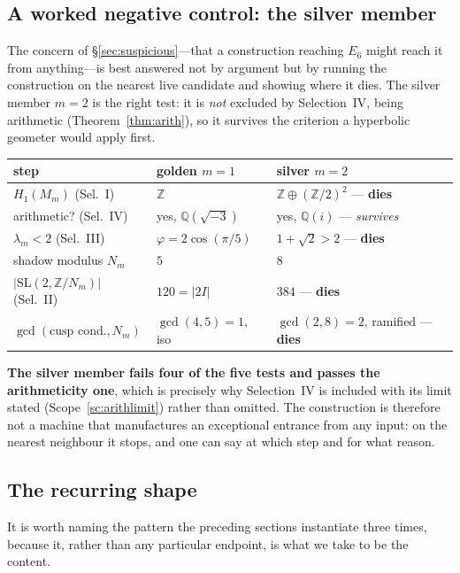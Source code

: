 \documentclass[11pt,reqno]{amsart}
\theoremstyle{plain}
\theoremstyle{definition}
\theoremstyle{remark}
\newcommand{\Q}{\mathbb{Q}}
\newcommand{\Z}{\mathbb{Z}}
\newcommand{\SL}{\mathrm{SL}}
\begin{document}
\subsection{A worked negative control: the silver member}\label{sec:silver}

The concern of \S\ref{sec:suspicious}---that a construction reaching $E_6$ might reach it
from anything---is best answered not by argument but by running the construction on the
nearest live candidate and showing where it dies. The silver member $m=2$ is the right
test: it is \emph{not} excluded by Selection~IV, being arithmetic
(Theorem~\ref{thm:arith}), so it survives the criterion a hyperbolic geometer would apply
first.

\begin{table}[h]
\centering\small
\begin{tabular}{@{}p{}p{}p{}@{}}
\toprule
step & golden $m=1$ & silver $m=2$\\
\midrule
$H_1(M_m)$ (Sel.~I) & $\Z$ & $\Z\oplus(\Z/2)^2$ --- \textbf{dies}\\
arithmetic? (Sel.~IV) & yes, $\Q(\sqrt{-3})$ & yes, $\Q(i)$ --- \emph{survives}\\
$\lambda_m<2$ (Sel.~III) & $\varphi=2\cos(\pi/5)$ & $1+\sqrt2>2$ --- \textbf{dies}\\
shadow modulus $N_m$ & $5$ & $8$\\
$|\SL(2,\Z/N_m)|$ (Sel.~II) & $120=|2I|$ & $384$ --- \textbf{dies}\\
$\gcd(\text{cusp cond.},N_m)$ & $\gcd(4,5)=1$, iso & $\gcd(2,8)=2$, ramified --- \textbf{dies}\\
\bottomrule
\end{tabular}
\end{table}

\textbf{The silver member fails four of the five tests and passes the arithmeticity
one}, which is precisely why Selection~IV is included with its limit stated
(Scope~\ref{sc:arithlimit}) rather than omitted. The construction is therefore not a
machine that manufactures an exceptional entrance from any input: on the nearest
neighbour it stops, and one can say at which step and for what reason.

\subsection{The recurring shape}\label{sec:shape}

It is worth naming the pattern the preceding sections instantiate three times, because
it, rather than any particular endpoint, is what we take to be the content.
\end{document}
